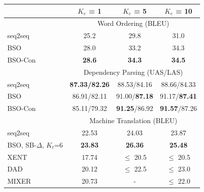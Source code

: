 \documentclass{beamer}
\begin{document}
\begin{frame}
  \vspace{-0.2cm}
  \begin{table}
  \centering
    \small
  \begin{tabular}{lccc}
    \toprule
    & $K_e$ = 1 & $K_e$ = 5 & $K_e$ = 10 \\ 
    \midrule
     & \multicolumn{3}{c}{Word Ordering (BLEU) } \\ 
    \midrule
    seq2seq & 25.2 & 29.8 & 31.0 \\
    BSO     & 28.0 & 33.2 & 34.3 \\
    BSO-Con & \textbf{28.6} & \textbf{34.3} & \textbf{34.5} \\
    \midrule


    & \multicolumn{3}{c}{Dependency Parsing (UAS/LAS) } \\ 
    seq2seq & \textbf{87.33/82.26} & 88.53/84.16 & 88.66/84.33\\
    BSO & 86.91/82.11 & 91.00/\textbf{87.18} & 91.17/\textbf{87.41} \\
    BSO-Con & 85.11/79.32 & \textbf{91.25}/86.92 & \textbf{91.57}/87.26 \\

    \midrule
    & \multicolumn{3}{c}{Machine Translation (BLEU) } \\ 
    seq2seq & 22.53 & 24.03 & 23.87 \\
    BSO, SB-$\Delta$, $K_t$=6 & \textbf{23.83} & \textbf{26.36} & \textbf{25.48} \\
    XENT & 17.74 & $\leq$ 20.5 & $\leq$ 20.5 \\
    DAD & 20.12 & $\leq$ 22.5 & $\leq$ 23.0 \\ 
    MIXER & 20.73 & - & $\leq$ 22.0 \\    
    \bottomrule
  \end{tabular}
  \label{tab:mtfinal}
\end{table}

\end{frame}
\end{document}
